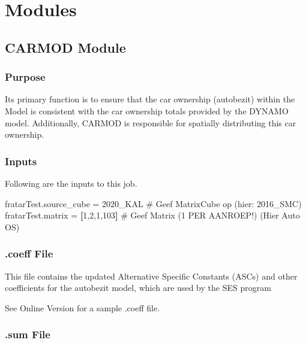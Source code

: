 \documentclass[
  letterpaper,
  DIV=11,
  numbers=noendperiod]{scrreprt}
\newenvironment{Shaded}{\begin{snugshade}}{\end{snugshade}}
\newcommand{\AttributeTok}[1]{\textcolor[rgb]{0.40,0.45,0.13}{#1}}
\newcommand{\CommentTok}[1]{\textcolor[rgb]{0.37,0.37,0.37}{#1}}
\newcommand{\DecValTok}[1]{\textcolor[rgb]{0.68,0.00,0.00}{#1}}
\newcommand{\KeywordTok}[1]{\textcolor[rgb]{0.00,0.23,0.31}{\textbf{#1}}}
\newcommand{\NormalTok}[1]{\textcolor[rgb]{0.00,0.23,0.31}{#1}}
\newcommand{\OperatorTok}[1]{\textcolor[rgb]{0.37,0.37,0.37}{#1}}
\newcommand{\VerbatimStringTok}[1]{\textcolor[rgb]{0.13,0.47,0.30}{#1}}
\begin{document}
\chapter{Modules}\label{modules}

\section{CARMOD Module}\label{carmod-module}

\subsection{Purpose}

Its primary function is to ensure that the car ownership (autobezit)
within the Model is consistent with the car ownership totals provided by
the DYNAMO model. Additionally, CARMOD is responsible for spatially
distributing this car ownership.

\subsection{Inputs}

Following are the inputs to this job.

\begin{Shaded}
\begin{Highlighting}[]
\NormalTok{fratarTest}\AttributeTok{.source\_cube} \OperatorTok{=} \VerbatimStringTok{\textquotesingle{}2020\_KAL\textquotesingle{}} \CommentTok{\# Geef MatrixCube op (hier: 2016\_SMC)        }
\NormalTok{fratarTest}\AttributeTok{.matrix} \OperatorTok{=} \KeywordTok{[}\DecValTok{1}\NormalTok{,}\DecValTok{2}\NormalTok{,}\DecValTok{1}\NormalTok{,}\DecValTok{103}\KeywordTok{]}     \CommentTok{\# Geef Matrix (1 PER AANROEP!) (Hier Auto OS)}
\end{Highlighting}
\end{Shaded}

\subsection{.coeff File}

This file contains the updated Alternative Specific Constants (ASCs) and
other coefficients for the autobezit model, which are used by the SES
program

See Online Version for a sample .coeff file.

\subsection{.sum File}
\end{document}
